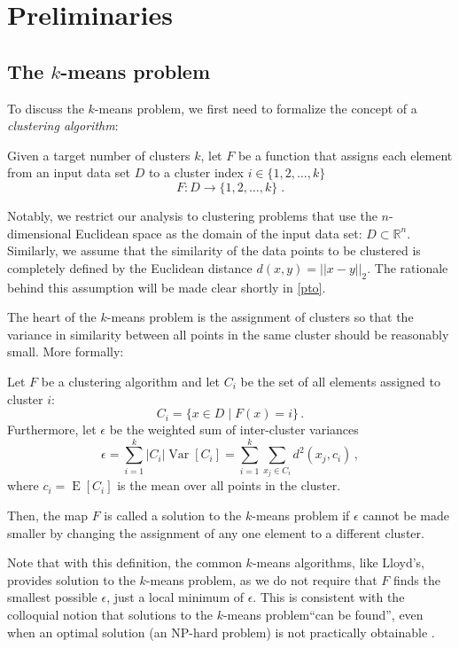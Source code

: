 \section{Preliminaries}
\newcommand{\kmeans}{$k$-means problem\xspace}


\subsection{The \kmeans}

To discuss the \kmeans, we first need to formalize the concept of a \emph{clustering algorithm}:
\begin{definition}
	Given a target number of clusters $k$,
	let $F$ be a function that assigns each element from an input data set $D$ to a
	cluster index $i \in \{1, 2, \ldots, k\}$
	$$ F:D \to \{1, 2, \ldots, k\} \;.$$
\end{definition}
Notably, we restrict our analysis to clustering problems that use the $n$-dimensional Euclidean space as the domain of the input data set: $D \subset \mathbb{R}^n$.
Similarly, we assume that the similarity of the data points to be clustered is completely defined by the Euclidean distance $d(x,y)= || x-y ||_2 $.
The rationale behind this assumption will be made clear shortly in \autoref{pto}.

The heart of the \kmeans is the assignment of clusters so that the variance in similarity between all points in the same cluster should be reasonably small.
More formally:
\begin{definition}[\kmeans]
	Let $F$ be a clustering algorithm
	and let $C_i$ be the set of all elements assigned to cluster $i$:
	$$ C_i = \{x \in D \mid F(x) = i\} \,.$$
	Furthermore, let $\epsilon$ be the weighted sum of inter-cluster variances
	$$ \epsilon = \sum_{i=1}^k |C_i| \operatorname{Var}[C_i] = \sum_{i=1}^k \sum_{x_j \in C_i}  d^2(x_j, c_i)\,, $$
	where $c_i = \operatorname{E}[C_i]$ is the mean over all points in the cluster.

	Then, the map $F$ is called a solution to the \kmeans
	if $\epsilon$ cannot be made smaller by changing the assignment of any one element to a different cluster.
\end{definition}
Note that with this definition, the common $k$-means algorithms, like Lloyd's, provides solution to the \kmeans,
as we do not require that $F$ finds the smallest possible $\epsilon$,
just a local minimum of $\epsilon$.
This is consistent with the colloquial notion that solutions to the \kmeans ``can be found'',
even when an optimal solution (an NP-hard problem) is not practically obtainable \cite{}.

